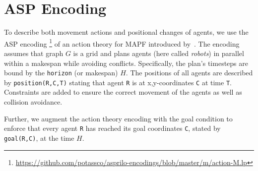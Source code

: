 \section{ASP Encoding}

%
%
To describe both movement actions and positional changes of agents,
we use the ASP encoding%
%
\footnote{%
 \url{https://github.com/potassco/asprilo-encodings/blob/master/m/action-M.lp}}
%
of an action theory for MAPF%
introduced by~\cite{geobotscsangso18a}.
The encoding assumes that graph \(G\) is a grid and plans agents (here called \emph{robots}) in parallel within a makespan while avoiding conflicts.
%
Specifically,
the plan's timesteps are bound by the \lstinline{horizon} (or makespan) $H$. %
%
The positions of all agents are described by \lstinline{position(R,C,T)} stating that agent \lstinline{R} is at x,y-coordinates \lstinline{C} at time \lstinline{T}. 
Constraints are added to ensure the correct movement of the agents as well as collision avoidance.

%
%
%
%
%
%
%
Further,
we augment the action theory encoding with the goal condition %
to enforce that every agent \lstinline{R} has reached its goal coordinates \lstinline{C}, stated by \lstinline{goal(R,C)},
at the time $H$.
%
%
%

